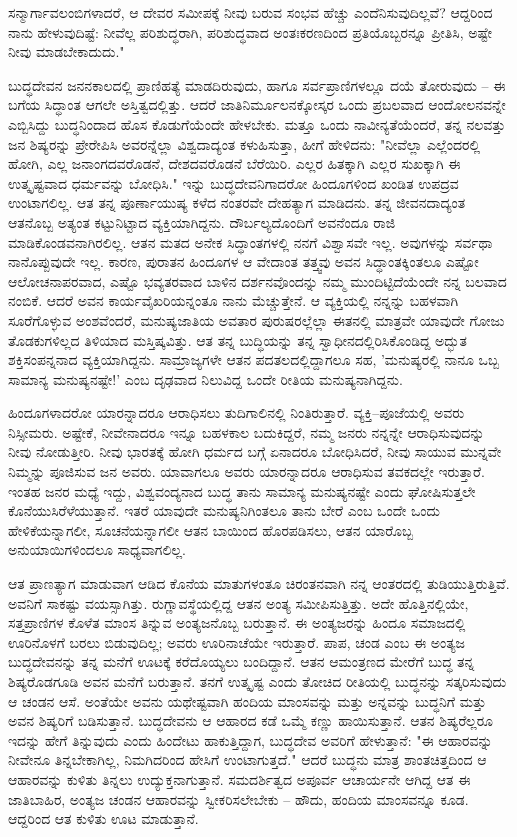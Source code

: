 ಸನ್ಮಾರ್ಗಾವಲಂಬಿಗಳಾದರೆ, ಆ ದೇವರ ಸಮೀಪಕ್ಕೆ ನೀವು ಬರುವ ಸಂಭವ ಹೆಚ್ಚು ಎಂದೆನಿಸುವುದಿಲ್ಲವೆ? ಆದ್ದರಿಂದ ನಾನು ಹೇಳುವುದಿಷ್ಟೆ: ನೀವೆಲ್ಲ ಪರಿಶುದ್ಧರಾಗಿ, ಪರಿಶುದ್ಧವಾದ ಅಂತಃಕರಣದಿಂದ ಪ್ರತಿಯೊಬ್ಬರನ್ನೂ ಪ್ರೀತಿಸಿ, ಅಷ್ಟೇ ನೀವು ಮಾಡಬೇಕಾದುದು."

ಬುದ್ಧದೇವನ ಜನನಕಾಲದಲ್ಲಿ ಪ್ರಾಣಿಹತ್ಯೆ ಮಾಡದಿರುವುದು, ಹಾಗೂ ಸರ್ವಪ್ರಾಣಿಗಳಲ್ಲೂ ದಯೆ ತೋರುವುದು – ಈ ಬಗೆಯ ಸಿದ್ಧಾಂತ ಆಗಲೇ ಅಸ್ತಿತ್ವದಲ್ಲಿತ್ತು. ಆದರೆ ಜಾತಿನಿರ್ಮೂಲನಕ್ಕೋಸ್ಕರ ಒಂದು ಪ್ರಬಲವಾದ ಆಂದೋಲನವನ್ನೇ ಎಬ್ಬಿಸಿದ್ದು ಬುದ್ಧನಿಂದಾದ ಹೊಸ ಕೊಡುಗೆಯೆಂದೇ ಹೇಳಬೇಕು. ಮತ್ತೂ ಒಂದು ನಾವೀನ್ಯತೆಯೆಂದರೆ, ತನ್ನ ನಲವತ್ತು ಜನ ಶಿಷ್ಯರನ್ನು ಪ್ರೇರೇಪಿಸಿ ಅವರನ್ನೆಲ್ಲಾ ವಿಶ್ವದಾದ್ಯಂತ ಕಳುಹಿಸುತ್ತಾ, ಹೀಗೆ ಹೇಳಿದನು: "ನೀವೆಲ್ಲಾ ಎಲ್ಲೆಂದರಲ್ಲಿ ಹೋಗಿ, ಎಲ್ಲ ಜನಾಂಗದವರೊಡನೆ, ದೇಶದವರೊಡನೆ ಬೆರೆಯಿರಿ. ಎಲ್ಲರ ಹಿತಕ್ಕಾಗಿ ಎಲ್ಲರ ಸುಖಕ್ಕಾಗಿ ಈ ಉತ್ಕೃಷ್ಟವಾದ ಧರ್ಮವನ್ನು ಬೋಧಿಸಿ." ಇನ್ನು ಬುದ್ಧದೇವನಿಗಾದರೋ ಹಿಂದೂಗಳಿಂದ ಖಂಡಿತ ಉಪದ್ರವ ಉಂಟಾಗಲಿಲ್ಲ. ಆತ ತನ್ನ ಪೂರ್ಣಾಯುಷ್ಯ ಕಳೆದ ನಂತರವೇ ದೇಹತ್ಯಾಗ ಮಾಡಿದನು. ತನ್ನ ಜೀವನದಾದ್ಯಂತ ಆತನೊಬ್ಬ ಅತ್ಯಂತ ಕಟ್ಟುನಿಟ್ಟಾದ ವ್ಯಕ್ತಿಯಾಗಿದ್ದನು. ದೌರ್ಬಲ್ಯದೊಂದಿಗೆ ಅವನೆಂದೂ ರಾಜಿ ಮಾಡಿಕೊಂಡವನಾಗಿರಲಿಲ್ಲ. ಆತನ ಮತದ ಅನೇಕ ಸಿದ್ಧಾಂತಗಳಲ್ಲಿ ನನಗೆ ವಿಶ್ವಾಸವೇ ಇಲ್ಲ. ಅವುಗಳನ್ನು ಸರ್ವಥಾ ನಾನೊಪ್ಪುವುದೇ ಇಲ್ಲ. ಕಾರಣ, ಪುರಾತನ ಹಿಂದೂಗಳ ಆ ವೇದಾಂತ ತತ್ತ್ವವು ಅವನ ಸಿದ್ಧಾಂತಕ್ಕಿಂತಲೂ ಎಷ್ಟೋ ಆಲೋಚನಾಪರವಾದ, ಎಷ್ಟೊ ಭವ್ಯತರವಾದ ಬಾಳಿನ ದರ್ಶನವೊಂದನ್ನು ನಮ್ಮ ಮುಂದಿಟ್ಟಿದೆಯೆಂದೇ ನನ್ನ ಬಲವಾದ ನಂಬಿಕೆ. ಆದರೆ ಅವನ ಕಾರ್ಯವೈಖರಿಯನ್ನಂತೂ ನಾನು ಮೆಚ್ಚುತ್ತೇನೆ. ಆ ವ್ಯಕ್ತಿಯಲ್ಲಿ ನನ್ನನ್ನು ಬಹಳವಾಗಿ ಸೂರೆಗೊಳ್ಳುವ ಅಂಶವೆಂದರೆ, ಮನುಷ್ಯಜಾತಿಯ ಅವತಾರ ಪುರುಷರಲ್ಲೆಲ್ಲಾ ಈತನಲ್ಲಿ ಮಾತ್ರವೇ ಯಾವುದೇ ಗೋಜು ತೊಡಕುಗಳಿಲ್ಲದ ತಿಳಿಯಾದ ಮಸ್ತಿಷ್ಕವಿತ್ತು. ಆತ ತನ್ನ ಬುದ್ಧಿಯನ್ನು ತನ್ನ ಸ್ವಾಧೀನದಲ್ಲಿರಿಸಿಕೊಂಡಿದ್ದ ಅದ್ಭುತ ಶಕ್ತಿಸಂಪನ್ನನಾದ ವ್ಯಕ್ತಿಯಾಗಿದ್ದನು. ಸಾಮ್ರಾಜ್ಯಗಳೇ ಆತನ ಪದತಲದಲ್ಲಿದ್ದಾಗಲೂ ಸಹ, 'ಮನುಷ್ಯರಲ್ಲಿ ನಾನೂ ಒಬ್ಬ ಸಾಮಾನ್ಯ ಮನುಷ್ಯನಷ್ಟೇ!' ಎಂಬ ದೃಢವಾದ ನಿಲುವಿದ್ದ ಒಂದೇ ರೀತಿಯ ಮನುಷ್ಯನಾಗಿದ್ದನು.

ಹಿಂದೂಗಳಾದರೋ ಯಾರನ್ನಾದರೂ ಆರಾಧಿಸಲು ತುದಿಗಾಲಿನಲ್ಲಿ ನಿಂತಿರುತ್ತಾರೆ. ವ್ಯಕ್ತಿ–ಪೂಜೆಯಲ್ಲಿ ಅವರು ನಿಸ್ಸೀಮರು. ಅಷ್ಟೇಕೆ, ನೀವೇನಾದರೂ ಇನ್ನೂ ಬಹಳಕಾಲ ಬದುಕಿದ್ದರೆ, ನಮ್ಮ ಜನರು ನನ್ನನ್ನೇ ಆರಾಧಿಸುವುದನ್ನು ನೀವು ನೋಡುತ್ತೀರಿ. ನೀವು ಭಾರತಕ್ಕೆ ಹೋಗಿ ಧರ್ಮದ ಬಗ್ಗೆ ಏನಾದರೂ ಬೋಧಿಸಿದರೆ, ನೀವು ಸಾಯುವ ಮುನ್ನವೇ ನಿಮ್ಮನ್ನು ಪೂಜಿಸುವ ಜನ ಅವರು. ಯಾವಾಗಲೂ ಅವರು ಯಾರನ್ನಾದರೂ ಆರಾಧಿಸುವ ತವಕದಲ್ಲೇ ಇರುತ್ತಾರೆ. ಇಂತಹ ಜನರ ಮಧ್ಯೆ ಇದ್ದು, ವಿಶ್ವವಂದ್ಯನಾದ ಬುದ್ಧ ತಾನು ಸಾಮಾನ್ಯ ಮನುಷ್ಯನಷ್ಟೇ ಎಂದು ಘೋಷಿಸುತ್ತಲೇ ಕೊನೆಯುಸಿರೆಳೆಯುತ್ತಾನೆ. ಇತರೆ ಯಾವುದೇ ಮನುಷ್ಯನಿಗಿಂತಲೂ ತಾನು ಬೇರೆ ಎಂಬ ಒಂದೇ ಒಂದು ಹೇಳಿಕೆಯನ್ನಾಗಲೀ, ಸೂಚನೆಯನ್ನಾಗಲೀ ಆತನ ಬಾಯಿಂದ ಹೊರಪಡಿಸಲು, ಆತನ ಯಾರೊಬ್ಬ ಅನುಯಾಯಿಗಳಿಂದಲೂ ಸಾಧ್ಯವಾಗಲಿಲ್ಲ.

ಆತ ಪ್ರಾಣತ್ಯಾಗ ಮಾಡುವಾಗ ಆಡಿದ ಕೊನೆಯ ಮಾತುಗಳಂತೂ ಚಿರಂತನವಾಗಿ ನನ್ನ ಆಂತರದಲ್ಲಿ ತುಡಿಯುತ್ತಿರುತ್ತಿವೆ. ಅವನಿಗೆ ಸಾಕಷ್ಟು ವಯಸ್ಸಾಗಿತ್ತು. ರುಗ್ಣಾವಸ್ಥೆಯಲ್ಲಿದ್ದ ಆತನ ಅಂತ್ಯ ಸಮೀಪಿಸುತ್ತಿತ್ತು. ಅದೇ ಹೊತ್ತಿನಲ್ಲಿಯೇ, ಸತ್ತಪ್ರಾಣಿಗಳ ಕೊಳೆತ ಮಾಂಸ ತಿನ್ನುವ ಅಂತ್ಯಜನೊಬ್ಬ ಬರುತ್ತಾನೆ. ಈ ಅಂತ್ಯಜರನ್ನು ಹಿಂದೂ ಸಮಾಜದಲ್ಲಿ ಊರಿನೊಳಗೆ ಬರಲು ಬಿಡುವುದಿಲ್ಲ; ಅವರು ಊರಿನಾಚೆಯೇ ಇರುತ್ತಾರೆ. ಪಾಪ, ಚಂಡ ಎಂಬ ಈ ಅಂತ್ಯಜ ಬುದ್ಧದೇವನನ್ನು ತನ್ನ ಮನೆಗೆ ಊಟಕ್ಕೆ ಕರೆದೊಯ್ಯಲು ಬಂದಿದ್ದಾನೆ. ಆತನ ಆಮಂತ್ರಣದ ಮೇರೆಗೆ ಬುದ್ಧ ತನ್ನ ಶಿಷ್ಯರೊಡಗೂಡಿ ಅವನ ಮನೆಗೆ ಬರುತ್ತಾನೆ. ತನಗೆ ಉತ್ಕೃಷ್ಟ ಎಂದು ತೋಚಿದ ರೀತಿಯಲ್ಲಿ ಬುದ್ಧನನ್ನು ಸತ್ಕರಿಸುವುದು ಆ ಚಂಡನ ಆಸೆ. ಅಂತೆಯೇ ಅವನು ಯಥೇಷ್ಟವಾಗಿ ಹಂದಿಯ ಮಾಂಸವನ್ನು ಮತ್ತು ಅನ್ನವನ್ನು ಬುದ್ಧನಿಗೆ ಮತ್ತು ಅವನ ಶಿಷ್ಯರಿಗೆ ಬಡಿಸುತ್ತಾನೆ. ಬುದ್ಧದೇವನು ಆ ಆಹಾರದ ಕಡೆ ಒಮ್ಮೆ ಕಣ್ಣು ಹಾಯಿಸುತ್ತಾನೆ. ಆತನ ಶಿಷ್ಯರೆಲ್ಲರೂ ಇದನ್ನು ಹೇಗೆ ತಿನ್ನುವುದು ಎಂದು ಹಿಂದೇಟು ಹಾಕುತ್ತಿದ್ದಾಗ, ಬುದ್ಧದೇವ ಅವರಿಗೆ ಹೇಳುತ್ತಾನೆ: "ಈ ಆಹಾರವನ್ನು ನೀವೇನೂ ತಿನ್ನಬೇಕಾಗಿಲ್ಲ, ನಿಮಗಿದರಿಂದ ಹೇಸಿಗೆ ಉಂಟಾಗುತ್ತದೆ." ಆದರೆ ಬುದ್ಧನು ಮಾತ್ರ ಶಾಂತಚಿತ್ತದಿಂದ ಆ ಆಹಾರವನ್ನು ಕುಳಿತು ತಿನ್ನಲು ಉದ್ಯುಕ್ತನಾಗುತ್ತಾನೆ. ಸಮದರ್ಶಿತ್ವದ ಅಪೂರ್ವ ಆಚಾರ್ಯನೇ ಆಗಿದ್ದ ಆತ ಈ ಜಾತಿಬಾಹಿರ, ಅಂತ್ಯಜ ಚಂಡನ ಆಹಾರವನ್ನು ಸ್ವೀಕರಿಸಲೇಬೇಕು – ಹೌದು, ಹಂದಿಯ ಮಾಂಸವನ್ನೂ ಕೂಡ. ಆದ್ದರಿಂದ ಆತ ಕುಳಿತು ಊಟ ಮಾಡುತ್ತಾನೆ.

